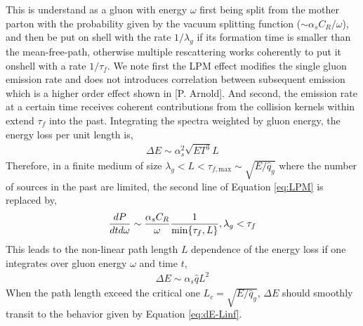 \documentclass[aps, prc, reprint, amsmath, groupedaddress, nofootinbib]{revtex4-1}
\begin{document}
This is understand as a gluon with energy $\omega$ first being split from the mother parton with the probability given by the vacuum splitting function ($\sim \alpha_s C_R/\omega$), and then be put on shell with the rate $1/\lambda_g$ if its formation time is smaller than the mean-free-path, otherwise multiple rescattering works coherently to put it onshell with a rate $1/\tau_f$. 
We note first the LPM effect modifies the single gluon emission rate and does not introduces correlation between subsequent emission which is a higher order effect shown in [P. Arnold].
And second, the emission rate at a certain time receives coherent contributions from the collision kernels within extend $\tau_f$ into the past.
Integrating the spectra weighted by gluon energy, the energy loss per unit length is,
\begin{eqnarray}\label{eq:dE-Linf}
\Delta E \sim \alpha_s^2 \sqrt{ET^3} L
\end{eqnarray}
Therefore, in a finite medium of size $\lambda_g < L< \tau_{f,\textrm{max}} \sim \sqrt{E/\hat{q}_g}$ where the number of sources in the past are limited, the second line of Equation \ref{eq:LPM} is replaced by,
\begin{eqnarray}
\frac{dP}{dt d\omega} \sim 
 \frac{\alpha_s C_R}{\omega} \frac{1}{\min\{\tau_f,L\}}, \hfill \lambda_g < \tau_f
\end{eqnarray}
This leads to the non-linear path length $L$ dependence of the energy loss if one integrates over gluon energy $\omega$ and time $t$,
\begin{eqnarray}\label{eq:dE-Lfinite}
\Delta E \sim \alpha_s \hat{q} L^2
\end{eqnarray}
When the path length exceed the critical one $L_c = \sqrt{E/\hat{q}_g}$, $\Delta E$ should smoothly transit to the behavior given by Equation \ref{eq:dE-Linf}.
\end{document}
